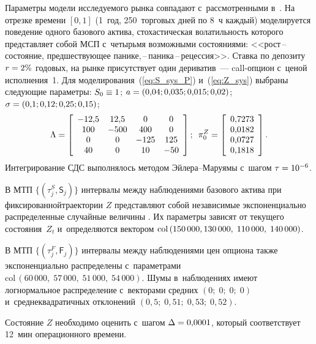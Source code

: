 \begin{multicols}{2}
Параметры модели исследуемого рынка совпадают с~рассмотренными в~\cite{B_23_3_IA}. На отрезке времени $[0,1]$ (1~год, 250~торговых дней по 
8~ч каждый) моделируется поведение одного базового актива, стохастическая 
волатильность которого пред\-став\-ля\-ет собой МСП с~четырьмя возможными состояниями: 
<<рост\,--\,со\-сто\-яние, предшествующее па\-ни\-ке,\,--\,па\-ни\-ка\,--\,ре\-цес\-сия>>.
Ставка по депозиту $r \hm= 2\%$ годовых, на рынке присутствует один дериватив~--- 
{call}-оп\-ци\-он с~ценой исполнения~1. Для моделирования~(\ref{eq:S_sys_P}) 
и~(\ref{eq:Z_sys}) выбраны следующие параметры:
$
S_0 \hm\equiv 1$; $a \hm= (0{,}04; 0{,}035; 0{,}015; 0{,}02)$; $\sigma \hm= (0{,}1; 0{,}12; 0{,}25; 0{,}15)$;
$$
\Lambda =
\left[
\begin{array}{cccc}
-12{,}5 & 12{,}5 & 0 & 0 \\
100 & -500 & 400 & 0 \\
0 & 0 & -125 & 125 \\
40 & 0 & 10 & -50 \\
\end{array}
\right]; \enskip
\pi_0^Z =
\left[
\begin{array}{c}
0{,}7273  \\
0{,}0182  \\
0{,}0727  \\
0{,}1818  \\
\end{array}
\right].
$$
Интегрирование СДС выполнялось методом Эй\-ле\-ра--Ма\-ру\-ямы с~шагом $\tau \hm= 10^{-6}$.

В МТП $\{(\tau_j^S, \mathsf{S}_j)\}$ интервалы между наблюдениями базового 
актива при фиксированной\linebreak траектории $Z$ представляют собой независимые 
экспоненциально распределенные случайные величины \cite{Scalas_04}. Их параметры 
зависят от текущего состояния~$Z_t$ и~определяются вектором 
$\mathrm{col}\,(150\,000,\linebreak 130\,000,\;110\,000,\;140\,000)$.

В МТП $\{(\tau_j^F, \mathsf{F}_j)\}$ интервалы между наблюдениями цен опциона 
также экспоненциально распределены с~параметрами
$\mathrm{col}\,(60\,000,\;57\,000,\;51\,000,\;54\,000)$. Шумы в~наблюдениях имеют 
логнормальное распределение с~векторами средних $(0;\; 0;\; 0;\; 0)$ 
и~среднеквадратичных отклонений $(0{,}5;\; 0{,}51;\; 0{,}53;\; 0{,}52)$.

Состояние $Z$ необходимо оценить с~шагом  $\Delta\hm=0{,}0001$, который 
соответствует 12~мин операционного времени.


\end{multicols}
